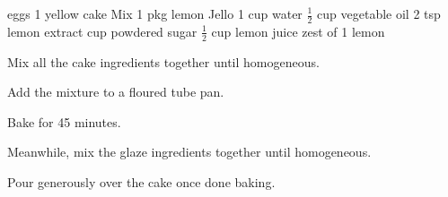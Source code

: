 \dishtype{\dessert}
\dishother{\vegetarian}
\begin{ingreds}
     eggs
        1 yellow cake Mix
        1 pkg lemon Jello
        1 cup water
        $\frac{1}{2}$ cup vegetable oil
        2 tsp lemon extract
    \columnbreak{}
     cup powdered sugar
        $\frac{1}{2}$ cup lemon juice
        zest of 1 lemon
\end{ingreds}
\begin{method}
    Mix all the cake ingredients together until homogeneous.\par
    Add the mixture to a floured tube pan.\par
    Bake for 45 minutes.\par
    Meanwhile, mix the glaze ingredients together until homogeneous.\par
    Pour generously over the cake once done baking.
\end{method}
